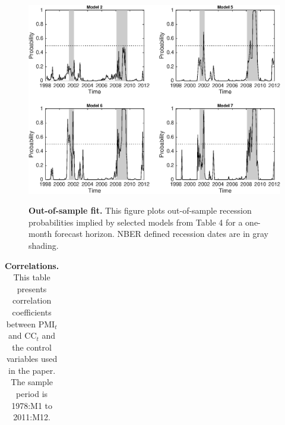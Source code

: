 \documentclass[12pt,a4paper,onecolumn,oneside,notitlepage]{article}
\begin{document}
\clearpage
\begin{figure}[htbp]
    \caption{
        \textbf{Out-of-sample fit.} \newline 
        This figure plots out-of-sample recession probabilities implied by selected models from Table 4 for a one-month forecast horizon. NBER defined recession dates are in gray shading.
    }
    \centering
    \includegraphics[scale=1]{Figures/Figure3_1.eps} 
    \label{fig:oosfit}
\end{figure}


\clearpage
\begin{table}[htbp]
    \centering
    \footnotesize
    \caption{
        \textbf{Correlations.} \newline 
        This table presents correlation coefficients between PMI$_{t}$ and CC$_{t}$ and the control variables used in the paper. The sample period is 1978:M1 to 2011:M12.
    }
    \begin{tabularx}{\textwidth}{YZZZZZZZ}
        \toprule
        
        \bottomrule
    \end{tabularx}
    \label{tab:cormat}
\end{table}
\end{document}
